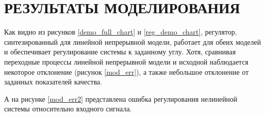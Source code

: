 \section{РЕЗУЛЬТАТЫ МОДЕЛИРОВАНИЯ}

Как видно из рисунков \ref{demo_full_chart} и \ref{reg_demo_chart}, регулятор, 
синтезированный
для линейной непрерывной модели, работает для обеих моделей и 
обеспечивает регулирование системы к заданному углу. Хотя, сравнивая
переходные процессы линейной непрерывной модели и исходной
наблюдается некоторое отклонение (рисунок \ref{mod_err}), а также 
небольшое отклонение от заданных показателей качества.


А на рисунке \ref{mod_err2} представлена ошибка
регулирования нелинейной системы относительно входного сигнала.

